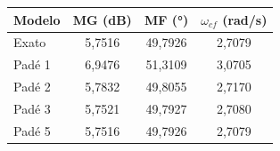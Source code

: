 \begin{tabular}{lccc}
\hline
Modelo & MG (dB) & MF (°) & $\omega_{cf}$ (rad/s) \\
\hline
Exato & 5{,}7516 & 49{,}7926 & 2{,}7079 \\
Padé 1 & 6{,}9476 & 51{,}3109 & 3{,}0705 \\
Padé 2 & 5{,}7832 & 49{,}8055 & 2{,}7170 \\
Padé 3 & 5{,}7521 & 49{,}7927 & 2{,}7080 \\
Padé 5 & 5{,}7516 & 49{,}7926 & 2{,}7079 \\
\hline
\end{tabular}
